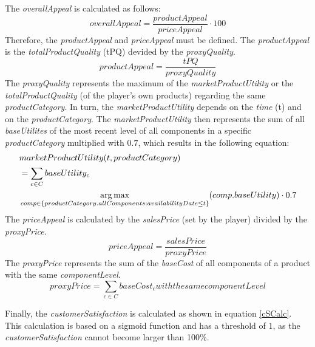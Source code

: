 The \textit{overallAppeal} is calculated as follows:
\begin{equation}
overallAppeal = \dfrac{productAppeal}{priceAppeal} \cdot 100
\end{equation}
Therefore, the \textit{productAppeal} and \textit{priceAppeal} must be defined.
The \textit{productAppeal} is the \textit{totalProductQuality} (tPQ) devided by the \textit{proxyQuality}.
\begin{equation}
    productAppeal = \dfrac{tPQ}{proxyQuality}
\end{equation}
The \textit{proxyQuality} represents the maximum of the \textit{marketProductUtility} or the \textit{totalProductQuality} (of the player's own products) regarding the same \textit{productCategory}.
In turn, the \textit{marketProductUtility} depends on the \textit{time} (t) and on the \textit{productCategory}. The \textit{marketProductUtility} then represents the sum of all \textit{baseUtilites} of the most recent level of all components in a specific \textit{productCategory} multiplied with $0.7$, which results in the following equation:
\begin{equation}
\begin{aligned}
    & marketProductUtility(t, productCategory) \\
    & = \sum_{c \in C} baseUtility_{c} \\
    & \operatorname*{arg\,max}\limits_{comp\in \{productCategory.allComponents: availabilityDate \leq t\}}(comp.baseUtility) \cdot 0.7
\end{aligned}    
\end{equation}
The \textit{priceAppeal} is calculated by the \textit{salesPrice} (set by the player) divided by the \textit{proxyPrice}.
\begin{equation}
    priceAppeal = \dfrac{salesPrice}{proxyPrice}
\end{equation}
The \textit{proxyPrice} represents the sum of the \textit{baseCost} of all components of a product with the same \textit{componentLevel}.
\begin{equation}
    proxyPrice = \sum_{c \in C} baseCost_{c} with the same componentLevel
\end{equation}

Finally, the \textit{customerSatisfaction} is calculated as shown in equation \ref{cSCalc}. This calculation is based on a sigmoid function and has a threshold of $1$, as the \textit{customerSatisfaction} cannot become larger than 100\%.

